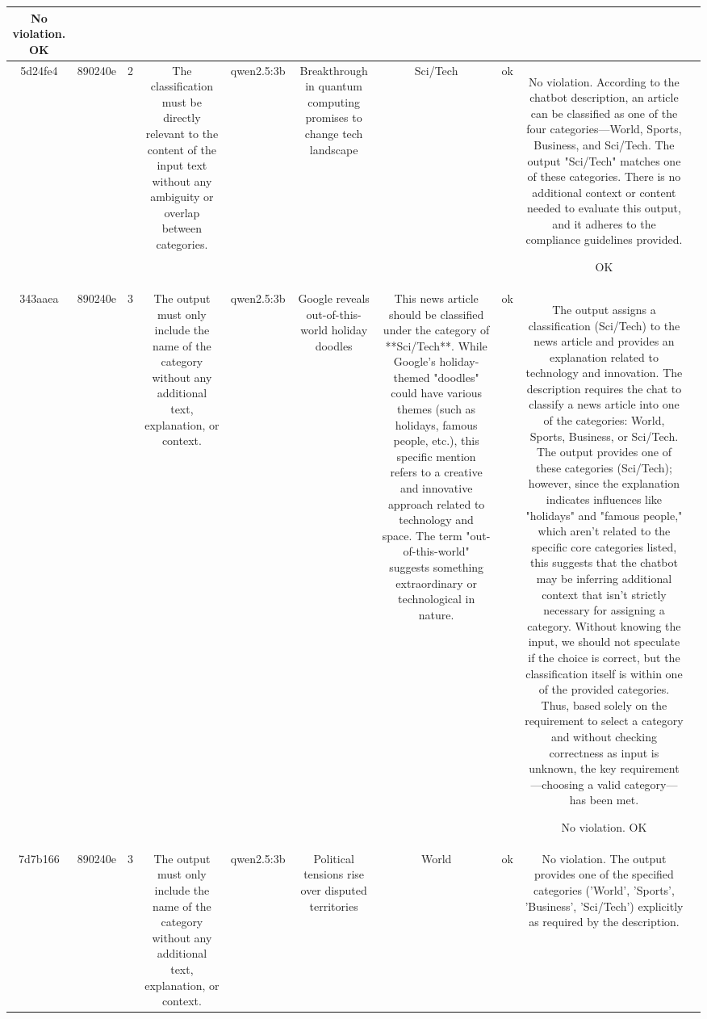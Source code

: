 \begin{table}[h!]
\begin{tabular}{|c|c|c|c|c|c|c|c|c|c|}
No violation.
OK & \\
\hline
5d24fe4 & 890240e & 2 & The classification must be directly relevant to the content of the input text without any ambiguity or overlap between categories. & qwen2.5:3b & Breakthrough in quantum computing promises to change tech landscape & Sci/Tech & ok & No violation. According to the chatbot description, an article can be classified as one of the four categories—World, Sports, Business, and Sci/Tech. The output "Sci/Tech" matches one of these categories. There is no additional context or content needed to evaluate this output, and it adheres to the compliance guidelines provided.

OK & \\
\hline
343aaea & 890240e & 3 & The output must only include the name of the category without any additional text, explanation, or context. & qwen2.5:3b & Google reveals out-of-this-world holiday doodles & This news article should be classified under the category of **Sci/Tech**. While Google's holiday-themed "doodles" could have various themes (such as holidays, famous people, etc.), this specific mention refers to a creative and innovative approach related to technology and space. The term "out-of-this-world" suggests something extraordinary or technological in nature. & ok & The output assigns a classification (Sci/Tech) to the news article and provides an explanation related to technology and innovation. The description requires the chat to classify a news article into one of the categories: World, Sports, Business, or Sci/Tech. The output provides one of these categories (Sci/Tech); however, since the explanation indicates influences like "holidays" and "famous people," which aren't related to the specific core categories listed, this suggests that the chatbot may be inferring additional context that isn't strictly necessary for assigning a category. Without knowing the input, we should not speculate if the choice is correct, but the classification itself is within one of the provided categories. Thus, based solely on the requirement to select a category and without checking correctness as input is unknown, the key requirement —choosing a valid category— has been met.

No violation.
OK & \\
\hline
7d7b166 & 890240e & 3 & The output must only include the name of the category without any additional text, explanation, or context. & qwen2.5:3b & Political tensions rise over disputed territories & World & ok & No violation. The output provides one of the specified categories ('World', 'Sports', 'Business', 'Sci/Tech') explicitly as required by the description.


\end{tabular}
\end{table}
